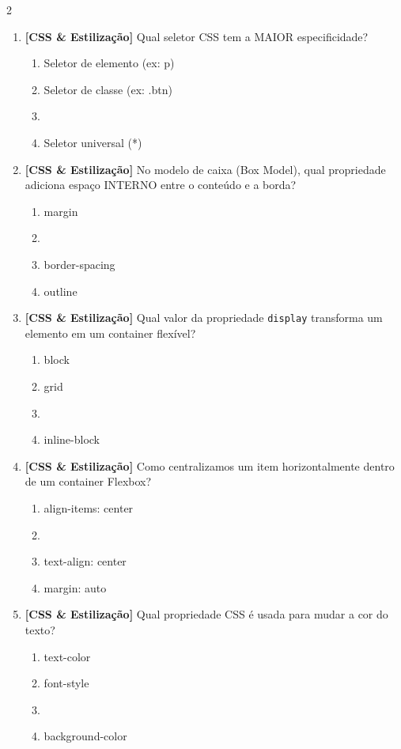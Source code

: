 \documentclass[a4paper,10pt]{article}
\begin{document}
\begin{multicols*}{2}
\begin{enumerate}[label=\textbf{\arabic*.}, resume, leftmargin=*]
\item \textbf{[CSS \& Estilização]} Qual seletor CSS tem a MAIOR especificidade?
\begin{enumerate}[label=(\alph*), noitemsep]
  \item Seletor de elemento (ex: p)
  \item Seletor de classe (ex: .btn)
  \item {}
  \item Seletor universal (*)
\end{enumerate}

\item \textbf{[CSS \& Estilização]} No modelo de caixa (Box Model), qual propriedade adiciona espaço INTERNO entre o conteúdo e a borda?
\begin{enumerate}[label=(\alph*), noitemsep]
  \item margin
  \item {}
  \item border-spacing
  \item outline
\end{enumerate}

\item \textbf{[CSS \& Estilização]} Qual valor da propriedade \texttt{display} transforma um elemento em um container flexível?
\begin{enumerate}[label=(\alph*), noitemsep]
  \item block
  \item grid
  \item {}
  \item inline-block
\end{enumerate}

\item \textbf{[CSS \& Estilização]} Como centralizamos um item horizontalmente dentro de um container Flexbox?
\begin{enumerate}[label=(\alph*), noitemsep]
  \item align-items: center
  \item {}
  \item text-align: center
  \item margin: auto
\end{enumerate}

\item \textbf{[CSS \& Estilização]} Qual propriedade CSS é usada para mudar a cor do texto?
\begin{enumerate}[label=(\alph*), noitemsep]
  \item text-color
  \item font-style
  \item {}
  \item background-color
\end{enumerate}


\end{enumerate}
\end{multicols*}
\end{document}
